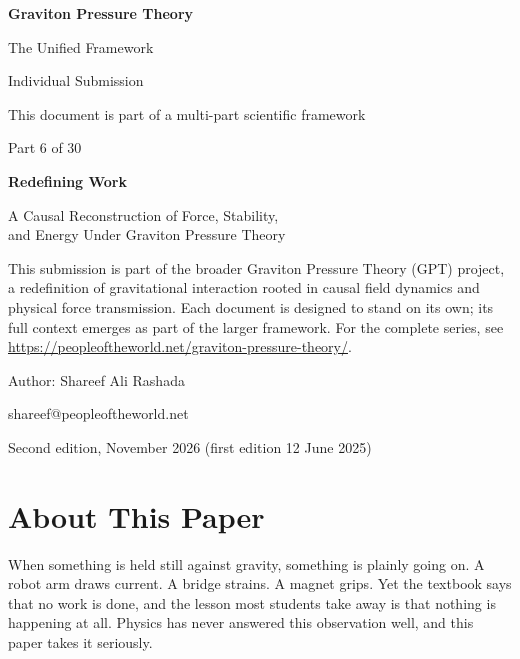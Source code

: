 \documentclass[11pt,a4paper]{article}
\begin{document}
\begin{titlepage}
\centering
\vspace*{1.5cm}
{\Huge\bfseries Graviton Pressure Theory\par}
\vspace{0.4cm}
{\Large The Unified Framework\par}
{\large Individual Submission\par}
\vspace{0.3cm}
{\normalsize This document is part of a multi-part scientific framework\par}
\vspace{1.6cm}
{\large Part 6 of 30\par}
\vspace{0.6cm}
{\huge\bfseries Redefining Work\par}
\vspace{0.5cm}
{\Large A Causal Reconstruction of Force, Stability,\\[2pt] and Energy Under Graviton Pressure Theory\par}
\vspace{1.4cm}
\begin{minipage}{0.82\textwidth}\centering\small
This submission is part of the broader Graviton Pressure Theory (GPT) project, a redefinition of gravitational interaction rooted in causal field dynamics and physical force transmission. Each document is designed to stand on its own; its full context emerges as part of the larger framework. For the complete series, see \url{https://peopleoftheworld.net/graviton-pressure-theory/}.
\end{minipage}
\vfill
{\large Author: Shareef Ali Rashada\par}
{\normalsize shareef@peopleoftheworld.net\par}
\vspace{0.3cm}
{\normalsize Second edition, November 2026 \quad (first edition 12 June 2025)\par}
\end{titlepage}

\tableofcontents
\newpage

\section*{About This Paper}

When something is held still against gravity, something is plainly going on. A robot arm draws current. A bridge strains. A magnet grips. Yet the textbook says that no work is done, and the lesson most students take away is that nothing is happening at all. Physics has never answered this observation well, and this paper takes it seriously.
\end{document}
